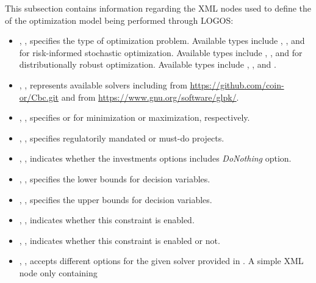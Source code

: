 This subsection contains information regarding the XML nodes used to define the
 of the optimization model being performed through LOGOS:
\begin{itemize}
  \item {}, , specifies the type of
  optimization problem. Available types include ,
  , and  for risk-informed stochastic optimization.
  Available types include , , and 
  for distributionally robust optimization. Available types include ,
  , and .
  \item {}, , represents available solvers including
   from \url{https://github.com/coin-or/Cbc.git} and  from
  \url{https://www.gnu.org/software/glpk/}.
  \item {}, , specifies 
  or  for minimization or maximization, respectively.
  \item {}, ,
  specifies regulatorily mandated or must-do projects.
  \item {}, , indicates whether the
  investments options includes \textit{DoNothing} option.
  \item {}, , specifies the lower bounds
  for decision variables.
  \item {}, , specifies the upper bounds
  for decision variables.
  \item {}, , indicates whether
  this constraint is enabled.
  \item {}, , indicates whether
  this constraint is enabled or not.
  \item {}, , accepts
  different options for the given solver provided in . A simple XML node only containing

\end{itemize}
